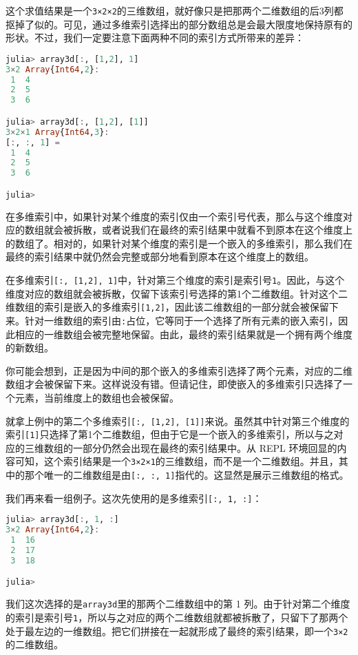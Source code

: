 这个求值结果是一个\verb`3×2×2`的三维数组，就好像只是把那两个二维数组的后3列都抠掉了似的。可见，通过多维索引选择出的部分数组总是会最大限度地保持原有的形状。不过，我们一定要注意下面两种不同的索引方式所带来的差异：

\begin{lstlisting}[language=julia]
julia> array3d[:, [1,2], 1]
3×2 Array{Int64,2}:
 1  4
 2  5
 3  6

julia> array3d[:, [1,2], [1]]
3×2×1 Array{Int64,3}:
[:, :, 1] =
 1  4
 2  5
 3  6

julia> 
\end{lstlisting}

在多维索引中，如果针对某个维度的索引仅由一个索引号代表，那么与这个维度对应的数组就会被拆散，或者说我们在最终的索引结果中就看不到原本在这个维度上的数组了。相对的，如果针对某个维度的索引是一个嵌入的多维索引，那么我们在最终的索引结果中就仍然会完整或部分地看到原本在这个维度上的数组。

在多维索引\verb`[:, [1,2], 1]`中，针对第三个维度的索引是索引号\verb`1`。因此，与这个维度对应的数组就会被拆散，仅留下该索引号选择的第1个二维数组。针对这个二维数组的索引是嵌入的多维索引\verb`[1,2]`，因此该二维数组的一部分就会被保留下来。针对一维数组的索引由\verb`:`占位，它等同于一个选择了所有元素的嵌入索引，因此相应的一维数组会被完整地保留。由此，最终的索引结果就是一个拥有两个维度的新数组。

你可能会想到，正是因为中间的那个嵌入的多维索引选择了两个元素，对应的二维数组才会被保留下来。这样说没有错。但请记住，即使嵌入的多维索引只选择了一个元素，当前维度上的数组也会被保留。

就拿上例中的第二个多维索引\verb`[:, [1,2], [1]]`来说。虽然其中针对第三个维度的索引\verb`[1]`只选择了第1个二维数组，但由于它是一个嵌入的多维索引，所以与之对应的三维数组的一部分仍然会出现在最终的索引结果中。从 REPL 环境回显的内容可知，这个索引结果是一个\verb`3×2×1`的三维数组，而不是一个二维数组。并且，其中的那个唯一的二维数组是由\verb`[:, :, 1]`指代的。这显然是展示三维数组的格式。

我们再来看一组例子。这次先使用的是多维索引\verb`[:, 1, :]`：

\begin{lstlisting}[language=julia]
julia> array3d[:, 1, :]
3×2 Array{Int64,2}:
 1  16
 2  17
 3  18

julia> 
\end{lstlisting}

我们这次选择的是\verb`array3d`里的那两个二维数组中的第 1 列。由于针对第二个维度的索引是索引号\verb`1`，所以与之对应的两个二维数组就都被拆散了，只留下了那两个处于最左边的一维数组。把它们拼接在一起就形成了最终的索引结果，即一个\verb`3×2`的二维数组。

